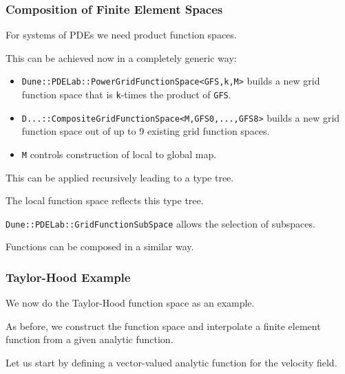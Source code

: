 
\begin{frame}
\frametitle<presentation>{Composition of Finite Element Spaces}
For systems of PDEs we need product function spaces.

This can be achieved now in a completely generic way:
\begin{itemize}
\item \lstinline{Dune::PDELab::PowerGridFunctionSpace<GFS,k,M>} builds a
new grid function space that is \lstinline{k}-times the product of \lstinline{GFS}.
\item \lstinline{D...::CompositeGridFunctionSpace<M,GFS0,...,GFS8>}
builds a new grid function space out of up to 9 existing grid function
spaces. 
\item \lstinline{M} controls construction of local to global map.
\end{itemize}

This can be applied recursively leading to a type tree.

The local function space reflects this type tree.

\lstinline{Dune::PDELab::GridFunctionSubSpace} allows the selection of
subspaces.

Functions can be composed in a similar way.
\end{frame}

\begin{frame}
\frametitle<presentation>{Taylor-Hood Example}
We now do the Taylor-Hood function space as an example.

As before, we construct the function space and interpolate a finite
element function from a given analytic function.

Let us start by defining a vector-valued analytic function for the
velocity field.  
\end{frame}

